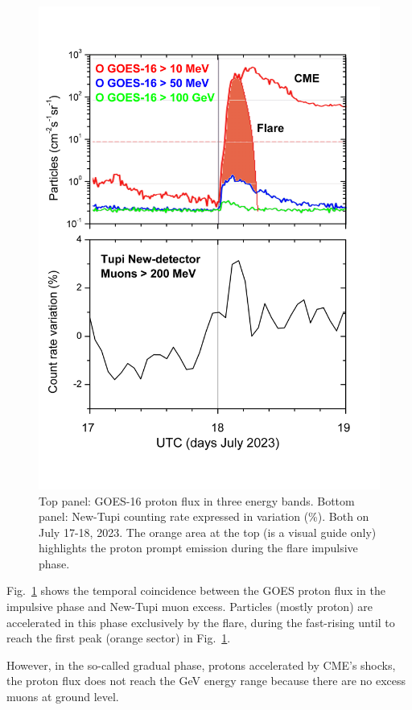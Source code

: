 \documentclass[twocolumn]{aastex63}
\begin{document}
\begin{figure}[]
\vspace*{-1.0cm}
\hspace*{-0.5cm}
\centering
\includegraphics[clip,width=0.5
\textwidth,height=0.4\textheight,angle=0.] {Fig4.png}
\vspace*{-0.5cm}
\caption{Top panel: GOES-16 proton flux in three energy bands. Bottom panel: New-Tupi counting rate expressed in variation (\%). Both on July 17-18, 2023. The orange area at the top (is a visual guide only) highlights the proton prompt emission during the flare impulsive phase.
}
\label{goes_tupi}
\end{figure} 


Fig.~\ref{goes_tupi} shows the temporal coincidence between the GOES proton flux in the impulsive phase and New-Tupi muon excess. Particles (mostly proton) are accelerated in this phase exclusively by the flare, during the fast-rising until to reach the first peak (orange sector) in Fig.~\ref{goes_tupi}.

However, in the so-called gradual phase, protons accelerated by CME's shocks, the proton flux does not reach the GeV energy range because there are no excess muons at ground level.
\end{document}
